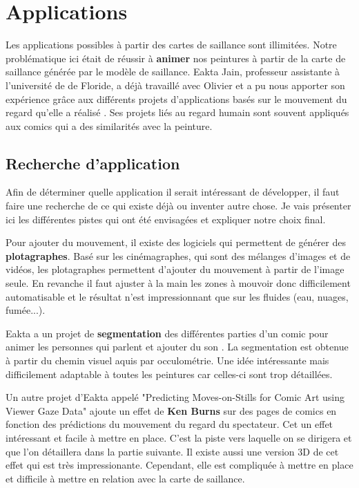\chapter{Applications}

\par
Les applications possibles à partir des cartes de saillance sont illimitées. Notre problématique ici était de réussir à \textbf{animer} nos peintures à partir de la carte de saillance générée par le modèle de saillance. Eakta Jain, professeur assistante à l'université de de Floride, a déjà travaillé avec Olivier et a pu nous apporter son expérience grâce aux différents projets d'applications basés sur le mouvement du regard qu'elle a réalisé \cite{eaktalab}. Ses projets liés au regard humain sont souvent appliqués aux comics qui a des similarités avec la peinture.

\section{Recherche d'application}

\par
Afin de déterminer quelle application il serait intéressant de développer, il faut faire une recherche de ce qui existe déjà ou inventer autre chose. Je vais présenter ici les différentes pistes qui ont été envisagées et expliquer notre choix final.

\par
Pour ajouter du mouvement, il existe des logiciels qui permettent de générer des \textbf{plotagraphes}. Basé sur les cinémagraphes, qui sont des mélanges d'images et de vidéos, les plotagraphes permettent d'ajouter du mouvement à partir de l'image seule. En revanche il faut ajuster à la main les zones à mouvoir donc difficilement automatisable et le résultat n'est impressionnant que sur les fluides (eau, nuages, fumée...).

\par
Eakta a un projet de \textbf{segmentation} des différentes parties d'un comic pour animer les personnes qui parlent et ajouter du son \cite{segmentationcomics}. La segmentation est obtenue à partir du chemin visuel aquis par occulométrie. Une idée intéressante mais difficilement adaptable à toutes les peintures car celles-ci sont trop détaillées.

\par
Un autre projet d'Eakta appelé "Predicting Moves-on-Stills for Comic Art using Viewer Gaze Data" \cite{kenburns} ajoute un effet de \textbf{Ken Burns} sur des pages de comics en fonction des prédictions du mouvement du regard du spectateur. Cet un effet intéressant et facile à mettre en place. C'est la piste vers laquelle on se dirigera et que l'on détaillera dans la partie suivante. Il existe aussi une version 3D de cet effet \cite{kenburns3D} qui est très impressionante. Cependant, elle est compliquée à mettre en place et difficile à mettre en relation avec la carte de saillance.

